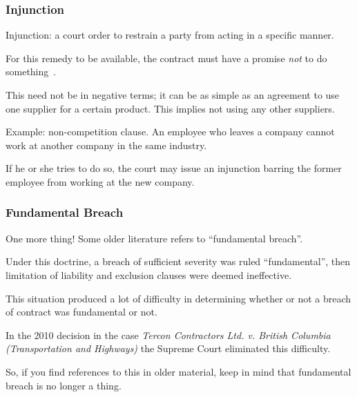 \begin{frame}
\frametitle{Injunction}

\alert{Injunction}: a court order to restrain a party from acting in a specific manner. 

For this remedy to be available, the contract must have a promise \textit{not} to do something~\cite{lba}.

This need not be in negative terms; it can be as simple as an agreement to use one supplier for a certain product. This implies not using any other suppliers.

Example: non-competition clause. An employee who leaves a company cannot work at another company in the same industry.

If he or she tries to do so, the court may issue an injunction barring the former employee from working at the new company.


\end{frame}


\begin{frame}
\frametitle{Fundamental Breach}

One more thing! Some older literature refers to ``fundamental breach''.

Under this doctrine, a breach of sufficient severity was ruled ``fundamental'', then limitation of liability and exclusion clauses were deemed ineffective.

This situation produced a lot of difficulty in determining whether or not a breach of contract was fundamental or not.

In the 2010 decision in the case \textit{Tercon Contractors Ltd. v. British Columbia (Transportation and Highways)} the Supreme Court eliminated this difficulty.

So, if you find references to this in older material, keep in mind that fundamental breach is no longer a thing.

\end{frame}




